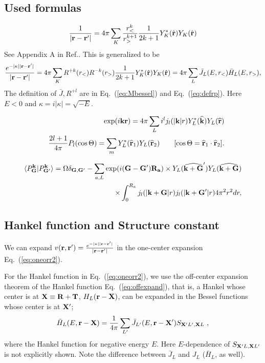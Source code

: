 \documentclass[a4paper,10pt,fleqn]{article}
\newcommand{\bfr}{{\bf r}}
\newcommand{\bfX}{{\bf X}}
\newcommand{\bfT}{{\bf T}}
\newcommand{\bfR}{{\bf R}}
\newcommand{\req}[1]{\mbox{Eq.~(\ref{#1})}}
\begin{document}
\subsection{Used formulas}
\label{usedf}

\begin{eqnarray}
\frac{1}{|\bfr-\bfr'|}
=4 \pi \sum_K \frac{r^k_<}{r^{k+1}_>}\frac{1}{2k+1}
Y^*_K(\hat{\bfr})Y_K(\hat{\bfr}) \label{eq:oneorr}
\end{eqnarray}
See Appendix A in Ref.\cite{svane_evaluation_1986}.
This is generalized to be
\begin{eqnarray}
\frac{e^{-|\kappa| |\bfr-\bfr'|}}{|\bfr-\bfr'|}
=4 \pi \sum_K R^{+k}(r_<) R^{-k}(r_>)\frac{1}{2k+1}
Y^*_K(\hat{\bfr})Y_K(\hat{\bfr}) 
=4\pi \sum_L 
\bar{J}_L(E,r_<) \bar{H}_L(E,r_>), \label{eq:oneorr2}
\end{eqnarray}
The definition of $\bar{J},R^{+l}$ are in \req{eq:Mbessel} and \req{eq:defrp}.
Here $E<0$ and $\kappa= i|\kappa|=\sqrt{-E}$.

\begin{eqnarray}
&&\exp( i {\bf k} {\bf r}) = 4 \pi \sum_L i^l 
j_l(|{\bf k}|r)  Y^*_L( {\bf \widehat{ k} }) Y_L(\widehat{{\bf r}}) 
\label{eq:expandpw}\\
&&\frac{2l+1}{4 \pi} P_l(\cos\Theta) = \sum_m Y^*_L( {\bf \widehat{r}}_1) 
Y_L({\bf \widehat{r}}_2) \ \ \ \ \ \ 
[\cos \Theta = {\bf \widehat{r}}_1 \cdot {\bf \widehat{r}}_2].
\end{eqnarray}

\begin{eqnarray}
\langle P^{\bf k}_{\bf G}|P^{\bf k}_{{\bf G}'} \rangle
= \Omega \delta_{{\bf G},{\bf G}'} -  
\sum_{a,L} \exp( i ({\bf G}-{\bf G}') {\bf R_a}) \times Y_L(\widehat{{\bf k+G}}') 
Y_L( {\bf \widehat{ k+G} }) \nonumber \\
\times \int_0^{R_a} j_l(|{\bf k+G}|r)j_l(|{\bf k+G}'|r) 4 \pi^2 r^2 dr,
\end{eqnarray}



\subsection{Hankel function and Structure constant}
We can expand 
$v(\bfr,\bfr')=\frac{e^{-|\kappa||\bfr-\bfr'|}}{|\bfr-\bfr'|}$
in the one-center expansion \req{eq:oneorr2}.

For the Hankel function in \req{eq:oneorr2}, we use
the off-center expansion theorem of the
Hankel function \req{eq:offexpand}, that is, 
a Hankel whose center is at $\bfX\equiv\bfR+\bfT$, $H_L(\bfr-\bfX)$, 
can be expanded in the Bessel functions whose center is at $\bfX'$;
\begin{eqnarray}
\bar{H}_L(E,\bfr-\bfX)=\frac{1}{4\pi} \sum_{L'}\bar{J}_{L'}(E,\bfr-\bfX') S_{\bfX'{L'},\bfX{L}}\ ,
\label{eq:offexpand}
\end{eqnarray}
where the Hankel function for negative energy $E$.
Here $E$-dependence of $S_{\bfX'{L},\bfX{L'}}$ is not explicitly shown. 
Note the difference between $\bar{J}_L$ and $J_L$ ($\bar{H}_L$, as well).
\end{document}
